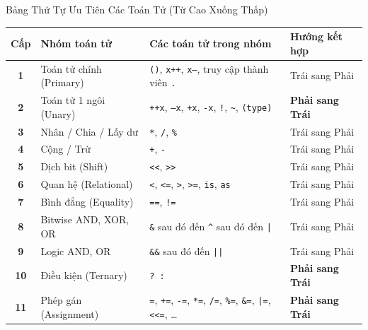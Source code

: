 \documentclass[aspectratio=169, 10pt]{beamer}
\begin{document}
\begin{frame}{Bảng Thứ Tự Ưu Tiên Các Toán Tử (Từ Cao Xuống Thấp)}
  \begin{table}[h]
    \centering
    \scriptsize
    \begin{tabularx}{\textwidth}{c l p{5.5cm} l}
      \toprule
      \textbf{Cấp} & \textbf{Nhóm toán tử} & \textbf{Các toán tử trong nhóm} & \textbf{Hướng kết hợp} \\
      \midrule
      \textbf{1} & Toán tử chính (Primary) & \texttt{()}, \texttt{x++}, \texttt{x--}, truy cập thành viên \texttt{.} & Trái sang Phải \\
      \textbf{2} & Toán tử 1 ngôi (Unary) & \texttt{++x}, \texttt{--x}, \texttt{+x}, \texttt{-x}, \texttt{!}, \texttt{\textasciitilde}, \texttt{(type)} & \textbf{Phải sang Trái} \\
      \textbf{3} & Nhân / Chia / Lấy dư & \texttt{*}, \texttt{/}, \texttt{\%} & Trái sang Phải \\
      \textbf{4} & Cộng / Trừ & \texttt{+}, \texttt{-} & Trái sang Phải \\
      \textbf{5} & Dịch bit (Shift) & \texttt{<<}, \texttt{>>} & Trái sang Phải \\
      \textbf{6} & Quan hệ (Relational) & \texttt{<}, \texttt{<=}, \texttt{>}, \texttt{>=}, \texttt{is}, \texttt{as} & Trái sang Phải \\
      \textbf{7} & Bình đẳng (Equality) & \texttt{==}, \texttt{!=} & Trái sang Phải \\
      \textbf{8} & Bitwise AND, XOR, OR & \texttt{\&} sau đó đến \texttt{\textasciicircum} sau đó đến \texttt{|} & Trái sang Phải \\
      \textbf{9} & Logic AND, OR & \texttt{\&\&} sau đó đến \texttt{||} & Trái sang Phải \\
      \textbf{10} & Điều kiện (Ternary) & \texttt{? :} & \textbf{Phải sang Trái} \\
      \textbf{11} & Phép gán (Assignment) & \texttt{=}, \texttt{+=}, \texttt{-=}, \texttt{*=}, \texttt{/=}, \texttt{\%=}, \texttt{\&=}, \texttt{|=}, \texttt{<<=}, \dots & \textbf{Phải sang Trái} \\
      \bottomrule
    \end{tabularx}
  \end{table}
\end{frame}
\end{document}
